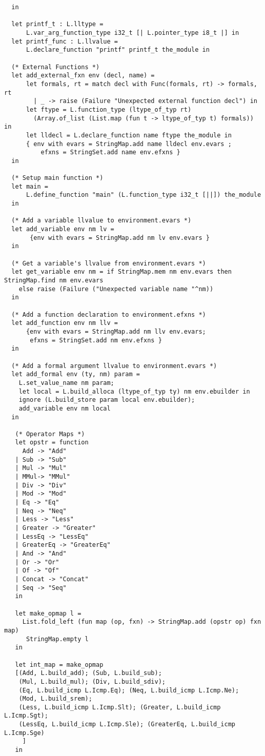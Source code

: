 \documentclass[main.tex]{subfiles}
\begin{document}
\begin{lstlisting}
  in

  let printf_t : L.lltype = 
      L.var_arg_function_type i32_t [| L.pointer_type i8_t |] in
  let printf_func : L.llvalue = 
      L.declare_function "printf" printf_t the_module in

  (* External Functions *)
  let add_external_fxn env (decl, name) =
      let formals, rt = match decl with Func(formals, rt) -> formals, rt
        | _ -> raise (Failure "Unexpected external function decl") in
      let ftype = L.function_type (ltype_of_typ rt)
        (Array.of_list (List.map (fun t -> ltype_of_typ t) formals)) in
      let lldecl = L.declare_function name ftype the_module in
      { env with evars = StringMap.add name lldecl env.evars ;
          efxns = StringSet.add name env.efxns }
  in

  (* Setup main function *)
  let main =
      L.define_function "main" (L.function_type i32_t [||]) the_module
  in

  (* Add a variable llvalue to environment.evars *)
  let add_variable env nm lv =
       {env with evars = StringMap.add nm lv env.evars }
  in
  
  (* Get a variable's llvalue from environment.evars *)
  let get_variable env nm = if StringMap.mem nm env.evars then StringMap.find nm env.evars
    else raise (Failure ("Unexpected variable name "^nm))
  in

  (* Add a function declaration to environment.efxns *)
  let add_function env nm llv = 
      {env with evars = StringMap.add nm llv env.evars;
       efxns = StringSet.add nm env.efxns }
  in

  (* Add a formal argument llvalue to environment.evars *)
  let add_formal env (ty, nm) param =
    L.set_value_name nm param;
    let local = L.build_alloca (ltype_of_typ ty) nm env.ebuilder in
    ignore (L.build_store param local env.ebuilder);
    add_variable env nm local
  in

   (* Operator Maps *)
   let opstr = function
     Add -> "Add"
   | Sub -> "Sub"
   | Mul -> "Mul"
   | MMul-> "MMul"
   | Div -> "Div"
   | Mod -> "Mod"
   | Eq -> "Eq"
   | Neq -> "Neq"
   | Less -> "Less"
   | Greater -> "Greater"
   | LessEq -> "LessEq"
   | GreaterEq -> "GreaterEq"
   | And -> "And"
   | Or -> "Or" 
   | Of -> "Of"
   | Concat -> "Concat"
   | Seq -> "Seq"
   in

   let make_opmap l =
     List.fold_left (fun map (op, fxn) -> StringMap.add (opstr op) fxn map)
      StringMap.empty l
   in

   let int_map = make_opmap
   [(Add, L.build_add); (Sub, L.build_sub);
    (Mul, L.build_mul); (Div, L.build_sdiv);
    (Eq, L.build_icmp L.Icmp.Eq); (Neq, L.build_icmp L.Icmp.Ne);
    (Mod, L.build_srem);
    (Less, L.build_icmp L.Icmp.Slt); (Greater, L.build_icmp L.Icmp.Sgt);
    (LessEq, L.build_icmp L.Icmp.Sle); (GreaterEq, L.build_icmp L.Icmp.Sge)
     ]
   in
   

\end{lstlisting}
\end{document}
